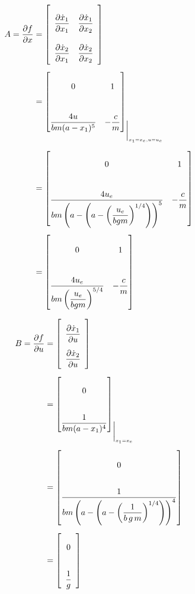 \begin{align*}
    A = \dfrac{\partial f}{\partial x} 
    &=
    \renewcommand{\arraystretch}{3}
        \left[
            \begin{array}{cc}
                \dfrac{\partial \dot{x}_1}{\partial x_1} & \dfrac{\partial \dot{x}_1}{\partial x_2} \\
                \dfrac{\partial \dot{x}_2}{\partial x_1} & \dfrac{\partial \dot{x}_2}{\partial x_2}
            \end{array}
        \right]
    \renewcommand{\arraystretch}{4.0}\\[1ex]
    &= 
        \begin{bmatrix}
        0 & 1 \\[3ex]
        \dfrac{4u}{bm (a - x_{1})^5} & -\dfrac{c}{m}
    \end{bmatrix}_{\bigg|_{x_{1}=x_e, u=u_{e}}}
    \\[1ex]    
    &=
    \begin{bmatrix}
        0 & 1 \\[3ex]
        \dfrac{4u_{e}}{bm \left( a - \left( a - \left( \dfrac{u_{e}}{bgm} \right)^{1/4}\right) \right)^5} & -\dfrac{c}{m}
    \end{bmatrix} \\[1ex]
    &=
    \begin{bmatrix}
        0 & 1 \\[3ex]
        \dfrac{4u_{e}}{bm \left( \dfrac{u_{e}}{bgm} \right)^{5/4}} & -\dfrac{c}{m}
    \end{bmatrix}
\end{align*}


\begin{align*}
    B = \dfrac{\partial f}{\partial u} 
    &=
        \renewcommand{\arraystretch}{2.5}
        \left[
            \begin{array}{c}
                \dfrac{\partial \dot{x}_1}{\partial u} \\
                \dfrac{\partial \dot{x}_2}{\partial u}
            \end{array}
        \right]
        \renewcommand{\arraystretch}{2.5}\\[1ex]
     &=
        \begin{bmatrix}
            0 \\[2ex]
             \dfrac{1}{bm (a - x_{1})^4}
        \end{bmatrix}_{\bigg|_{x_{1}=x_e}}\\[1ex]  
   &=
        \begin{bmatrix}
            0 \\[2ex]
            \dfrac{1}{bm\left(a- \left( a -{{\left(\dfrac{1}{b\,g\,m}\right)}}^{1/4}\right)\right)^4}
        \end{bmatrix}\\[1ex]
    &= 
        \left[
            \begin{array}{c}0\\[2ex]
                \dfrac{1}{g}
            \end{array}
        \right]
\end{align*}

